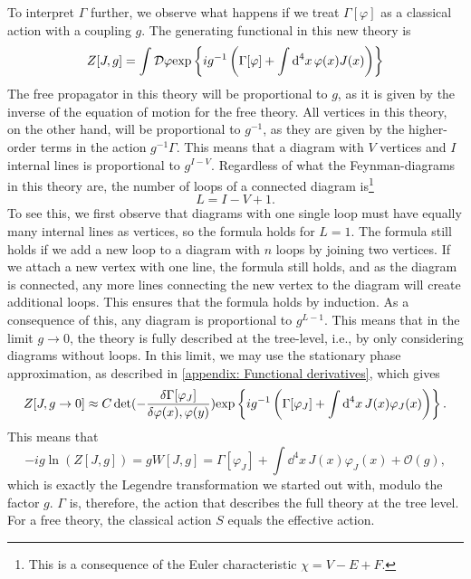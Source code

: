 To interpret $\Gamma$ further, we observe what happens if we treat $\Gamma[\varphi]$ as a classical action with a coupling $g$.
The generating functional in this new theory is
\begin{equation}
    \label{partition function with g}
    Z[J, g] = \int \mathcal D \varphi 
    \text{exp} \left\{  i g^{-1} \left( \Gamma[\varphi] + \int \text{d}^4x \, \varphi(x) J(x) \right)  \right\}
\end{equation}
%
The free propagator in this theory will be proportional to $g$, as it is given by the inverse of the equation of motion for the free theory.
All vertices in this theory, on the other hand, will be proportional to $g^{-1}$, as they are given by the higher-order terms in the action $g^{-1}\Gamma$.
This means that a diagram with $V$ vertices and $I$ internal lines is proportional to $g^{I-V}$.
Regardless of what the Feynman-diagrams in this theory are, the number of loops of a connected diagram is\footnote{This is a consequence of the Euler characteristic $\chi = V - E + F$.}
\begin{equation}
    \label{Number of loops}
    L = I - V + 1.
\end{equation}
%
To see this, we first observe that diagrams with one single loop must have equally many internal lines as vertices, so the formula holds for $L = 1$.
The formula still holds if we add a new loop to a diagram with $n$ loops by joining two vertices.
If we attach a new vertex with one line, the formula still holds, and as the diagram is connected, any more lines connecting the new vertex to the diagram will create additional loops.
This ensures that the formula holds by induction.
As a consequence of this, any diagram is proportional to $g^{L-1}$.
This means that in the limit $g \rightarrow 0$, the theory is fully described at the tree-level, i.e., by only considering diagrams without loops.
In this limit, we may use the stationary phase approximation, as described in \autoref{appendix: Functional derivatives}, which gives
\begin{equation}
    Z[J, g\rightarrow 0] \approx 
    C \det(- \fdv{ \Gamma[\varphi_J]}{\varphi(x), \varphi(y)})
    \exp{i g^{-1} \left(\Gamma[\varphi_J] + \int \dd^4x \, J(x) \varphi_J(x) \right)  }.
\end{equation}
%
This means that
\begin{equation}
    -i g \ln(Z[J, g]) 
    = g W[J, g] 
    = \Gamma[\varphi_J] + \int \dd^4x\,  J(x) \varphi_J(x) + \mathcal{O}(g),
\end{equation}
%
which is exactly the Legendre transformation we started out with, modulo the factor $g$.
$\Gamma$ is, therefore, the action that describes the full theory at the tree level.
For a free theory, the classical action $S$ equals the effective action.

